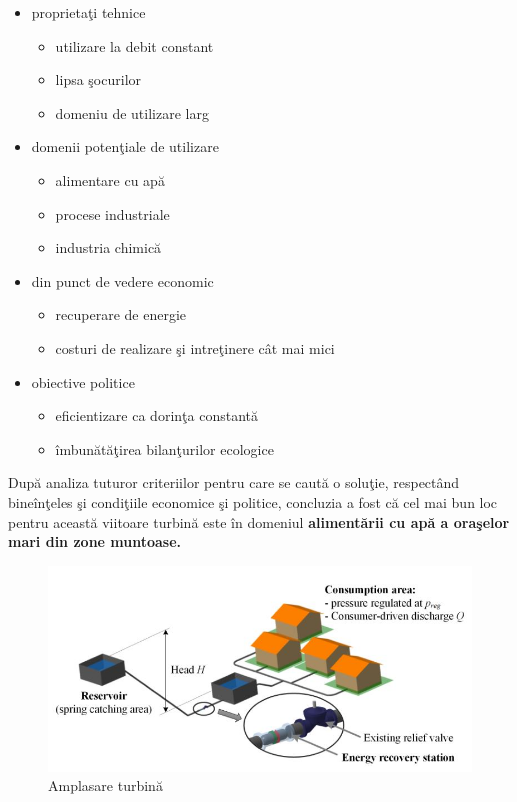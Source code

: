 \begin{itemize}
	\item proprieta\c{t}i tehnice
		\begin{itemize}
			\item utilizare la debit constant
			\item lipsa \c{s}ocurilor
			\item domeniu de utilizare larg
		\end{itemize}
	\item domenii poten\c{t}iale de utilizare
		\begin{itemize}
			\item alimentare cu ap\u{a}
			\item procese industriale
			\item industria chimic\u{a}
		\end{itemize}
	\item din punct de vedere economic
		\begin{itemize}
			\item recuperare de energie
			\item costuri de realizare \c{s}i intre\c{t}inere c\^{a}t mai mici
		\end{itemize}
	\item obiective politice
		\begin{itemize}
			\item eficientizare ca dorin\c{t}a constant\u{a}
			\item \^{i}mbun\u{a}t\u{a}\c{t}irea bilan\c{t}urilor ecologice
		\end{itemize}	
\end{itemize}

Dup\u{a} analiza tuturor criteriilor pentru care se caut\u{a} o solu\c{t}ie, respect\^{a}nd bine\^{i}n\c{t}eles \c{s}i condi\c{t}iile economice \c{s}i politice, concluzia a fost c\u{a} cel mai bun loc pentru aceast\u{a} viitoare turbin\u{a} este \^{i}n domeniul \textbf{aliment\u{a}rii cu ap\u{a} a ora\c{s}elor mari din zone muntoase.}

\begin{figure}[h!]
	\centering
	\includegraphics[scale=0.7]{figures/amplasare_turbina.jpg}
	\caption{Amplasare turbin\u{a} \cite{andolfatto2016simulation}}
	\label{Amplasare turbin\u{a}}
\end{figure}

